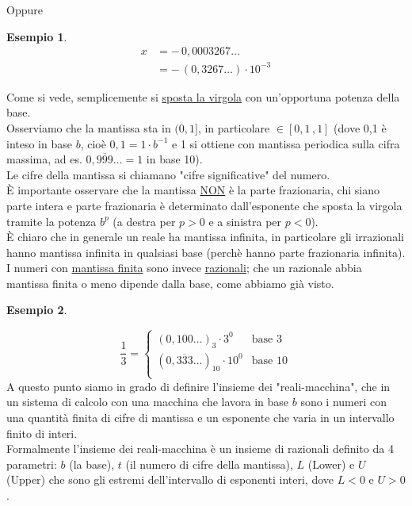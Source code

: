\documentclass[12pt]{article}
\newtheorem*{esempio}{Esempio}
\begin{document}
Oppure
\begin{esempio}
\[\begin{split}
    x & = - \, 0,0003267 \dotsc \\
    & = - \, (0,3267 \dotsc) \cdot 10^{-3} 
\end{split}\]
\end{esempio}
Come si vede, semplicemente si \underline{sposta la virgola} con un'opportuna potenza della base. \\
Osserviamo che la mantissa sta in $(0,1]$, in particolare $\in [0,1 \, , 1]$ (dove 0,1 è inteso in base $b$, cioè $0,1 = 1 \cdot b^{-1}$ e 1 si ottiene con mantissa periodica sulla cifra massima, ad es. $0,\overline{999} \dotsc = 1$ in base 10). \\
Le cifre della mantissa si chiamano "cifre significative" del numero. \\
È importante osservare che la mantissa \underline{NON} è la parte frazionaria, chi siano parte intera e parte frazionaria è determinato dall'esponente che sposta la virgola tramite la potenza $b^p$ (a destra per $p>0$ e a sinistra per $p<0$). \\
È chiaro che in generale un reale ha mantissa infinita, in particolare gli irrazionali hanno mantissa infinita in qualsiasi base (perchè hanno parte frazionaria infinita). \\
I numeri con \underline{mantissa finita} sono invece \underline{razionali}; che un razionale abbia mantissa finita o meno dipende dalla base, come abbiamo già visto.
\begin{esempio} \end{esempio}
\[\frac{1}{3} = 
\begin{cases}
    (0,100 \dotsc)_3 \cdot 3^0 & \text{base 3} \\
    (0,\overline{333} \dotsc)_{10} \cdot 10^0 & \text{base 10} \\
\end{cases}
\]
\newline \newline
A questo punto siamo in grado di definire l'insieme dei "reali-macchina", che in un sistema di calcolo con una macchina che lavora in base $b$ sono i numeri con una quantità finita di cifre di mantissa e un esponente che varia in un intervallo finito di interi. \\
Formalmente l'insieme dei reali-macchina è un insieme di razionali definito da 4 parametri: $b$ (la base), $t$ (il numero di cifre della mantissa), $L$ (Lower) e $U$ (Upper) che sono gli estremi dell'intervallo di esponenti interi, dove $L < 0$ e $U > 0$.
\end{document}
